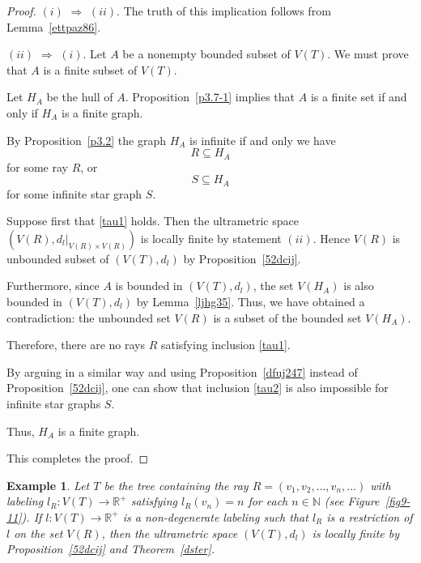 \documentclass[pdflatex,sn-mathphys-num]{sn-jnl}%
\theoremstyle{thmstyletwo}%
\newtheorem{example}{Example}%
\begin{document}
\begin{proof}

$(i)$ $\Rightarrow$ $(ii)$. The truth of this implication follows from Lemma~\ref{ettpaz86}.

$(ii)$ $\Rightarrow$ $(i)$. Let $A$ be a nonempty bounded subset of $V(T)$.
We must prove that $A$ is a finite subset of $V(T)$.

Let $H_A$ be the hull of $A$. Proposition~\ref{p3.7-1} implies that $A$ is a finite set if and only if $H_A$ is a finite graph. 

By Proposition~\ref{p3.2} the graph $H_A$ is infinite if and only we have
\begin{equation}\label{tau1}
R \subseteq H_A 
\end{equation}
for some ray $R$, or 
\begin{equation}\label{tau2}
S \subseteq H_A
\end{equation}
for some  infinite star graph $S$.

Suppose first that \eqref{tau1} holds. Then the ultrametric space 
$
(V(R), d_l|_{V(R) \times V(R)})
$
is locally finite by statement $(ii)$. Hence $V(R)$ is unbounded subset of $(V(T), d_l)$ by Proposition~\ref{52dcij}.

Furthermore, since $A$ is bounded in $(V(T), d_l)$, the set $V(H_A)$ is also bounded in $(V(T), d_l)$ by Lemma~\ref{ljhg35}. Thus, we have obtained a contradiction: the unbounded set $V(R)$ is a subset of the bounded set $V(H_A)$. 

Therefore, there are no rays $R$ satisfying inclusion \eqref{tau1}.

By arguing in a similar way and using Proposition~\ref{dfuj247} instead of Proposition~\ref{52dcij}, one can show that inclusion \eqref{tau2} is also impossible for infinite star graphs $S$.

Thus, $H_A$ is a finite graph.

This completes the proof.
\end{proof}



\begin{example}
 Let $T$ be the tree containing the ray $R = (v_1, v_2, \ldots, v_n, \ldots)$ with labeling $l_R \colon V(T) \to \mathbb{R}^+$ satisfying $l_R(v_n) = n$ for each $n \in \mathbb{N}$ (see Figure~\ref{fig9-11}).
If $l \colon V(T) \to \mathbb{R}^+$ is a non-degenerate labeling such that $l_R$ is a restriction of $l$ on the set $V(R)$, then the ultrametric space $(V(T), d_l)$ is locally finite by Proposition~\ref{52dcij} and Theorem~\ref{dster}.

\end{example}
\end{document}
